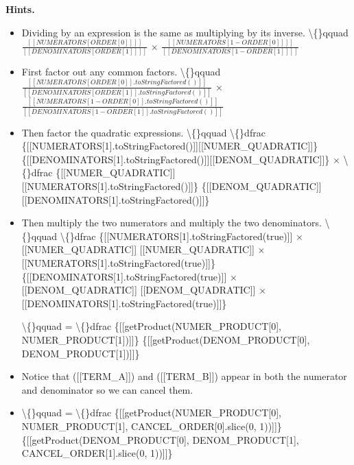 \documentclass{article}
\begin{document}
\textbf{Hints.}
\begin{itemize}
  \item Dividing by an expression is the same as multiplying by its inverse.
                \textbackslash\{\}qquad
                    $\frac{[[NUMERATORS[ORDER[0]]]]}{[[DENOMINATORS[ORDER[1]]]]}$ $\times$
                    $\frac{[[NUMERATORS[1 - ORDER[0]]]]}{[[DENOMINATORS[1 - ORDER[1]]]]}$
  \item First factor out any common factors.
                \textbackslash\{\}qquad
                    $\frac{[[NUMERATORS[ORDER[0]].toStringFactored()]]}{[[DENOMINATORS[ORDER[1]].toStringFactored()]]}$ $\times$
                    $\frac{[[NUMERATORS[1 - ORDER[0]].toStringFactored()]]}{[[DENOMINATORS[1 - ORDER[1]].toStringFactored()]]}$
  \item Then factor the quadratic expressions.
                \textbackslash\{\}qquad \textbackslash\{\}dfrac
                    \{[[NUMERATORS[1].toStringFactored()]][[NUMER\_QUADRATIC]]\}
                    \{[[DENOMINATORS[1].toStringFactored()]][[DENOM\_QUADRATIC]]\}
                    $\times$ \textbackslash\{\}dfrac
                    \{[[NUMER\_QUADRATIC]][[NUMERATORS[1].toStringFactored()]]\}
                    \{[[DENOM\_QUADRATIC]][[DENOMINATORS[1].toStringFactored()]]\}
  \item Then multiply the two numerators and multiply the two denominators.
                \textbackslash\{\}qquad \textbackslash\{\}dfrac
                    \{[[NUMERATORS[1].toStringFactored(true)]] $\times$ [[NUMER\_QUADRATIC]]
                     [[NUMER\_QUADRATIC]] $\times$ [[NUMERATORS[1].toStringFactored(true)]]\}
                    \{[[DENOMINATORS[1].toStringFactored(true)]] $\times$ [[DENOM\_QUADRATIC]]
                     [[DENOM\_QUADRATIC]] $\times$ [[DENOMINATORS[1].toStringFactored(true)]]\}
                

                \textbackslash\{\}qquad = \textbackslash\{\}dfrac
                    \{[[getProduct(NUMER\_PRODUCT[0], NUMER\_PRODUCT[1])]]\}
                    \{[[getProduct(DENOM\_PRODUCT[0], DENOM\_PRODUCT[1])]]\}
  \item Notice that ([[TERM\_A]]) and ([[TERM\_B]]) appear in both the numerator and denominator so we can cancel them.
  \item \textbackslash\{\}qquad = \textbackslash\{\}dfrac
                    \{[[getProduct(NUMER\_PRODUCT[0], NUMER\_PRODUCT[1], CANCEL\_ORDER[0].slice(0, 1))]]\}
                    \{[[getProduct(DENOM\_PRODUCT[0], DENOM\_PRODUCT[1], CANCEL\_ORDER[1].slice(0, 1))]]\}
                


\end{itemize}
\end{document}

